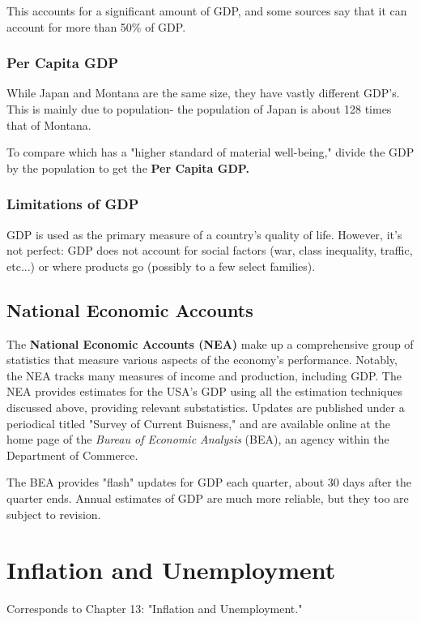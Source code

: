 \documentclass[12pt, a4paper]{article}
\theoremstyle{definition}
\begin{document}
This accounts for a significant amount of GDP, and some sources say that it can account for more than 50\% of GDP.

\subsubsection{Per Capita GDP}
While Japan and Montana are the same size, they have vastly different GDP's.
This is mainly due to population- the population of Japan is about 128 times that of Montana.

To compare which has a "higher standard of material well-being," divide the GDP by the population to get the \textbf{Per Capita GDP.}

\subsubsection{Limitations of GDP}
GDP is used as the primary measure of a country's quality of life.
However, it's not perfect: GDP does not account for social factors (war, class inequality, traffic, etc...) or where products go (possibly to a few select families).

\subsection{National Economic Accounts}
The \textbf{National Economic Accounts (NEA)} make up a comprehensive group of statistics that measure various aspects of the economy's performance.
Notably, the NEA tracks many measures of income and production, including GDP.
The NEA provides estimates for the USA's GDP using all the estimation techniques discussed above, providing relevant substatistics.
Updates are published under a periodical titled "Survey of Current Buisness," and are available online at the home page of the \textit{Bureau of Economic Analysis} (BEA), an agency within the Department of Commerce.

The BEA provides "flash" updates for GDP each quarter, about 30 days after the quarter ends.
Annual estimates of GDP are much more reliable, but they too are subject to revision.

\newpage

\section{Inflation and Unemployment}
Corresponds to Chapter 13: "Inflation and Unemployment."

\newpage
\end{document}
